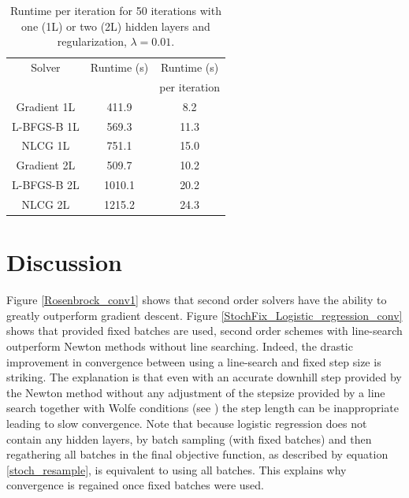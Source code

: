 \documentclass[11pt,twocolumn]{article}
\begin{document}
\begin{table}[h!]
\begin{center}
\begin{tabular}{ ccc} %
\hline
Solver & Runtime (s) & Runtime (s)  \\ 
& &per iteration \\
\hline 
\hline
Gradient 1L& 411.9 & 8.2\\ 
L-BFGS-B 1L& 569.3  & 11.3\\ 
NLCG 1L& 751.1 & 15.0 \\ 
Gradient 2L& 509.7 & 10.2 \\ 
L-BFGS-B 2L& 1010.1  & 20.2\\ 
NLCG 2L& 1215.2 & 24.3 \\ \end{tabular}
\end{center}
\caption{Runtime per iteration for 50 iterations with one (1L) or two (2L) hidden layers and regularization, $\lambda = 0.01$.}\label{rt_nn}
\end{table}

\section{Discussion}

 Figure \ref{Rosenbrock_conv1} shows that second order solvers have the ability to greatly outperform gradient descent. Figure \ref{StochFix_Logistic_regression_conv} shows that provided fixed batches are used, second order schemes with line-search outperform Newton methods without line searching. Indeed, the drastic improvement in convergence between using a line-search and fixed step size is striking. The explanation is that even with an accurate downhill step provided by the Newton method without any adjustment of the stepsize provided by a line search together with Wolfe conditions (see \cite{Nocedal:Wright}) the step length can be inappropriate leading to slow convergence. Note that because logistic regression does not contain any hidden layers, by batch sampling (with fixed batches) and then regathering all batches in the final objective function, as described by equation \ref{stoch_resample}, is equivalent to using all batches. This explains why convergence is regained once fixed batches were used.
\end{document}
